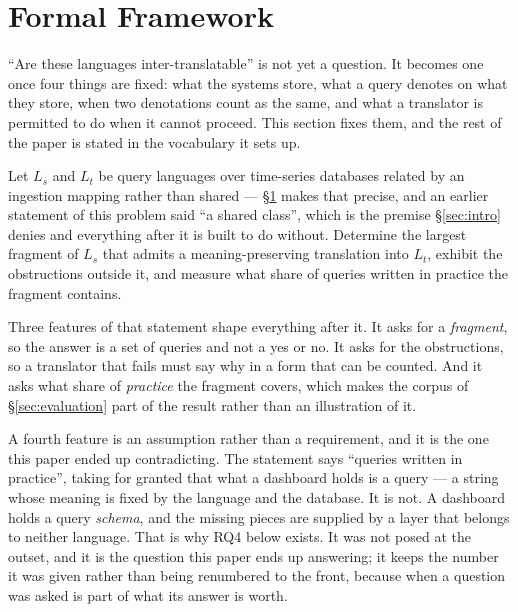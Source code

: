 
\section{Formal Framework}
\label{sec:framework}

``Are these languages inter-translatable'' is not yet a question. It becomes one once
four things are fixed: what the systems store, what a query denotes on what they store,
when two denotations count as the same, and what a translator is permitted to do when it
cannot proceed. This section fixes them, and the rest of the paper is stated in the
vocabulary it sets up.

\begin{problem}
Let $L_s$ and $L_t$ be query languages over time-series databases related by an
ingestion mapping rather than shared --- \S\ref{sec:framework} makes that precise, and
an earlier statement of this problem said ``a shared class'', which is the premise
\S\ref{sec:intro} denies and everything after it is built to do without.
Determine the largest fragment of $L_s$ that admits a meaning-preserving translation into
$L_t$, exhibit the obstructions outside it, and measure what share of queries written in
practice the fragment contains.
\end{problem}

\noindent
Three features of that statement shape everything after it. It asks for a
\emph{fragment}, so the answer is a set of queries and not a yes or no. It asks for the
obstructions, so a translator that fails must say why in a form that can be counted.
And it asks what share of \emph{practice} the fragment covers, which makes the
corpus of \S\ref{sec:evaluation} part of the result rather than an illustration of it.

A fourth feature is an assumption rather than a requirement, and it is the one this paper
ended up contradicting. The statement says ``queries written in practice'', taking for
granted that what a dashboard holds is a query --- a string whose meaning is fixed by the
language and the database. It is not. A dashboard holds a query \emph{schema}, and the
missing pieces are supplied by a layer that belongs to neither language. That is why
RQ4 below exists. It was not posed at the outset, and it is the question this paper
ends up answering; it keeps the number it was given rather than being renumbered to the
front, because when a question was asked is part of what its answer is worth.

